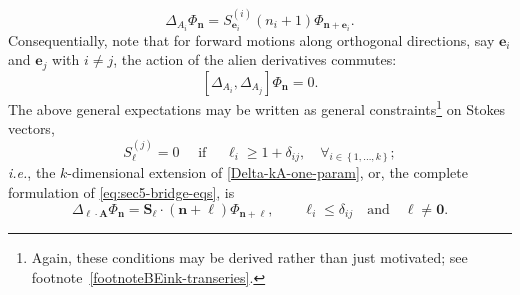 \documentclass[11pt,a4paper]{article}
\newcommand{\be}{\begin{equation}}
\newcommand{\ee}{\end{equation}}
\begin{document}
%
\begin{equation}
\label{AlienA_jonPhin}
\Delta_{A_i} \Phi_{\boldsymbol{n}} = S_{\boldsymbol{e}_i}^{(i)} \left(n_i+1\right) \Phi_{\boldsymbol{n}+\boldsymbol{e}_i}.
\end{equation}
%
\noindent
Consequentially, note that for forward motions along orthogonal directions, say $\boldsymbol{e}_i$ and $\boldsymbol{e}_j$ with $i \neq j$, the action of the alien derivatives commutes:
%
\begin{equation}
\label{eq:sec5-commutator-orthogonal-forward}
\left[ \Delta_{A_i}, \Delta_{A_j} \right] \Phi_{\boldsymbol{n}} = 0.
\end{equation}
%
\noindent
The above general expectations may be written as general constraints\footnote{Again, these conditions may be derived rather than just motivated; see footnote~\ref{footnoteBEink-transeries}.} on Stokes vectors,
%
\begin{equation}
\label{eq:sec5-Stokes-const-condition}
S_{\boldsymbol{\ell}}^{(j)}=0 \quad \text{ if } \quad \ell_{i} \ge 1 + \delta_{ij}, \quad \forall_{i \in \left\{ 1,\ldots,k \right\}};
\end{equation}
%
\noindent
\textit{i.e.}, the $k$-dimensional extension of \eqref{Delta-kA-one-param}, or, the complete formulation of \eqref{eq:sec5-bridge-eqs}, is
%
\be
\label{eq:sec5-bridge-eqs-COMPLETE}
\Delta_{\boldsymbol{\ell} \cdot \boldsymbol{A}} \Phi_{\boldsymbol{n}} = \boldsymbol{S}_{\boldsymbol{\ell}} \cdot \left(\boldsymbol{n}+\boldsymbol{\ell}\right) \Phi_{\boldsymbol{n}+\boldsymbol{\ell}}, \qquad \ell_i \leq \delta_{ij} \quad \text{and} \quad \boldsymbol{\ell} \neq \boldsymbol{0}.
\ee
\end{document}
